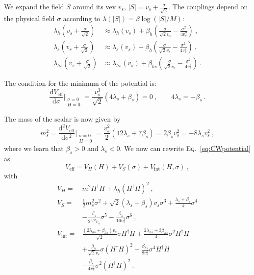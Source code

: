 \documentclass[aps,prd,preprintnumbers,nofootinbibn,twocolumn]{revtex4}
\newcommand{\dif}{\mathrm{d}}
\begin{document}
We expand the field $S$ around its vev $v_s$, $|S| = v_s + \frac{\sigma}{\sqrt{2}}$. The couplings depend on the physical field $\sigma$ according to $\lambda(|S|) = \beta \log(|S|/M)$:
\begin{subequations}
\begin{align}
\lambda_h\left(v_s + \frac{\sigma}{\sqrt{2}}\right) &\approx \lambda_h(v_s) + \beta_h \left(\frac{\sigma}{\sqrt{2}v_s}-\frac{\sigma^2}{4 v_s^2}\right)\ ,\\
\lambda_s\left(v_s + \frac{\sigma}{\sqrt{2}}\right) &\approx \lambda_s(v_s) + \beta_h \left(\frac{\sigma}{\sqrt{2}v_s}-\frac{\sigma^2}{4 v_s^2}\right)\ ,\\
\lambda_{hs}\left(v_s + \frac{\sigma}{\sqrt{2}}\right) &\approx \lambda_{hs}(v_s) + \beta_{hs} \left(\frac{\sigma}{\sqrt{2}v_s}-\frac{\sigma^2}{4 v_s^2}\right)\ .
\end{align}
\end{subequations}

The condition for the minimum of the potential is:
\begin{equation}
\frac{\dif V_\mathrm{eff}}{\dif \sigma}\Big|_{\substack{\sigma=0\\ H=0}} = \frac{v_s^3}{\sqrt{2}}(4\lambda_s + \beta_s) = 0\ ,  \qquad 4\lambda_s = - \beta_s \ . 
\end{equation}

The mass of the scalar is now given by
\begin{equation}
m_s^2 = \frac{\dif^2 V_\mathrm{eff}}{\dif \sigma^2}\Big|_{\substack{\sigma=0\\ H=0}} \! =\frac{v_s^2}{2} (12 \lambda_s +7\beta_s) =2\beta_s v_s^2 = -8 \lambda_s v_s^2\ ,
\end{equation}
where we learn that $\beta_s > 0 $ and $ \lambda_s < 0$. We now can rewrite \textsc{Eq.}\ \eqref{eq:CWpotential} as
\begin{equation}
V_\mathrm{eff} = V_H (H) + V_S (\sigma) + V_\mathrm{int}(H, \sigma)\ ,
\end{equation}
with
\begin{subequations}
\begin{align}
V_H =& m^2 H^\dagger H + \lambda_h (H^\dagger H)^2\label{eq:quadraticCW}\ , \\
V_S =& \frac{1}{2}m_s^2 \sigma^2 + \sqrt{2}(\lambda_s+\beta_s)v_s \sigma^3 + \frac{\lambda_s+\beta_s}{4}\sigma^4 \nonumber \\ &- \frac{\beta_s}{2^{5/2} v_s}\sigma^5 - \frac{\beta_s}{16 v_s^2}\sigma^6\ \label{eq:Spotential},\\
V_\mathrm{int} =& \frac{(2\lambda_{hs} + \beta_{hs})v_s}{\sqrt{2}}\sigma H^\dagger H + \frac{2\lambda_{hs} + 3\beta_{hs}}{4}\sigma^2 H^\dagger H\nonumber\\ &+ \frac{\beta_h}{\sqrt{2} v_s}\sigma (H^\dagger H)^2 - \frac{\beta_{hs}}{8 v_s^2}\sigma^4 H^\dagger H\nonumber \\ &- \frac{\beta_h}{4 v_s^2}\sigma^2 (H^\dagger H)^2\ . \label{eq:interlagr}
\end{align}
\end{subequations}
\end{document}
